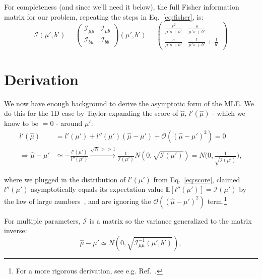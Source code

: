For completeness (and since we'll need it below), the full Fisher information matrix for our problem, repeating the steps in Eq.~\ref{eq:fisher}, is:
\begin{equation}
    \mathcal I(\mu', b')
    = \begin{pmatrix}\mathcal I_{\mu\mu} & \mathcal I_{\mu b} \\ \mathcal I_{b\mu} & \mathcal I_{bb}\end{pmatrix}(\mu', b')
    = \begin{pmatrix}
    \frac{s^2}{\mu' s + b'} & \frac{s}{\mu' s + b'} \\ \frac{s}{\mu' s + b'} & \frac{1}{\mu' s + b'} + \frac{1}{b'}
    \end{pmatrix}
\label{eq:fishermatrix}
\end{equation}


\section{Derivation}
\label{sec:pmle_derivation}

We now have enough background to derive the asymptotic form of the MLE.
We do this for the 1D case by Taylor-expanding the score of $\hat \mu$, $l'(\hat\mu)$ - which we know to be $ = 0$ - around $\mu'$:
\begin{align}
l'(\hat\mu) &= l'(\mu') + l''(\mu')(\hat\mu - \mu') + \mathcal O((\hat\mu - \mu')^2) = 0 \\
\Rightarrow \hat\mu - \mu' &\simeq - \frac{l'(\mu')}{l''(\mu')} \xrightarrow{\sqrt{N} >> 1} \frac{1}{\mathcal I(\mu')}N(0, \sqrt{\mathcal I(\mu')}) = N\bigg(0, \frac{1}{\sqrt{\mathcal I(\mu')}}\bigg),
\label{eq:taylorl}
\end{align}

where we plugged in the distribution of $l'(\mu')$ from Eq.~\ref{eq:score}, claimed $l''(\mu')$ asymptotically equals its expectation value $\mathbb E[l''(\mu')] = \mathcal I(\mu')$ by the law of large numbers~\cite{enwiki:1256071749}, and are ignoring the $\mathcal O((\hat\mu - \mu')^2)$ term.\footnote{For a more rigorous derivation, see e.g. Ref.~\cite{gundersen_asymptotic_2019}.}

For multiple parameters, $\mathcal I$ is a matrix so the variance generalized to the matrix inverse:
\begin{equation}
    \hat\mu - \mu' \simeq N(0, \sqrt{\mathcal I^{-1}_{\mu\mu}(\mu', b')}),
\label{eq:asym_std_fisher}
\end{equation}

